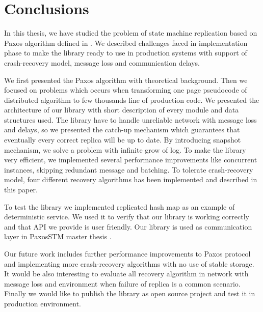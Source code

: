 \chapter{Conclusions}

%

In this thesis, we have studied the problem of state machine replication based
on Paxos algorithm defined in \cite{Lam98}. We described challenges faced in
implementation phase to make the library ready to use in production systems
with support of crash-recovery model, message loss and communication delays.

We first presented the Paxos algorithm with theoretical background. Then we
focused on problems which occurs when transforming one page pseudocode of
distributed algorithm to few thousands line of production code. We presented
the architecture of our library with short description of every module and data
structures used. The library have to handle unreliable network with message
loss and delays, so we presented the catch-up mechanism which guarantees that
eventually every correct replica will be up to date. By introducing snapshot
mechanism, we solve a problem with infinite grow of log. To make the library
very efficient, we implemented several performance improvements like concurrent
instances, skipping redundant message and batching. To tolerate crash-recovery
model, four different recovery algorithms has been implemented and described in
this paper.

To test the library we implemented replicated hash map as an example of
deterministic service. We used it to verify that our library is working
correctly and that API we provide is user friendly. Our library is used as 
communication layer in PaxosSTM master thesis \cite{Tad10}.

Our future work includes further performance improvements to Paxos protocol and
implementing more crash-recovery algorithms with no use of stable storage.  It
would be also interesting to evaluate all recovery algorithm in network with
message loss and environment when failure of replica is a common scenario.
Finally we would like to publish the library as open source project and test it
in production environment.

